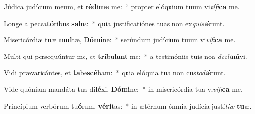 \item Júdica judícium meum, et \textbf{réd}i\textbf{me} me:~* propter elóquium tuum vi\textit{ví}\textit{fi}\textbf{ca} me.
\item Longe a pecca\textbf{tó}ribus \textbf{sa}lus:~* quia justificatiónes tuas non ex\textit{qui}\textit{si}\textbf{é}runt.
\item Misericórdiæ tuæ \textbf{mul}tæ, \textbf{Dó}\textbf{mi}ne:~* secúndum judícium tuum vi\textit{ví}\textit{fi}\textbf{ca} me.
\item Multi qui persequúntur me, et \textbf{trí}bu\textbf{lant} me:~* a testimóniis tuis non \textit{de}\textit{cli}\textbf{ná}vi.
\item Vidi prævaricántes, et \textbf{ta}be\textbf{scé}bam:~* quia elóquia tua non cus\textit{to}\textit{di}\textbf{é}runt.
\item Vide quóniam mandáta tua di\textbf{lé}xi, \textbf{Dó}\textbf{mi}ne:~* in misericórdia tua vi\textit{ví}\textit{fi}\textbf{ca} me.
\item Princípium verbórum tu\textbf{ó}rum, \textbf{vé}\textbf{ri}tas:~* in ætérnum ómnia judícia justí\textit{ti}\textit{æ} \textbf{tu}æ.
